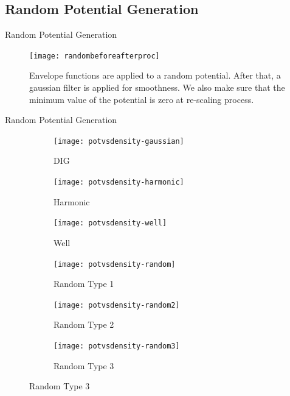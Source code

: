 \documentclass{beamer}
\begin{document}
\subsection{Random Potential Generation}

\begin{frame}{Random Potential Generation}

\graphicspath{{"../figs/potentials/"}}
\begin{figure}[H]
    \texttt{[image: randombeforeafterproc]}
\caption{Envelope functions are applied to a random potential. After that, a gaussian filter is applied for smoothness. We also make sure that the minimum value of the potential is zero at re-scaling process.}
\end{figure}

    
\end{frame}



\begin{frame}{Random Potential Generation}


\graphicspath{{"../figs/potentials/"}}
\begin{figure}[H]
    \centering
    \begin{subfigure}[t]{0.30\textwidth}
        \texttt{[image: potvsdensity-gaussian]}
        \caption{DIG}
    \end{subfigure}
    \begin{subfigure}[t]{0.30\textwidth}
        \texttt{[image: potvsdensity-harmonic]}
        \caption{Harmonic}
    \end{subfigure}
    \begin{subfigure}[t]{0.30\textwidth}
        \texttt{[image: potvsdensity-well]}
        \caption{Well}
    \end{subfigure}
    \begin{subfigure}[t]{0.30\textwidth}
        \texttt{[image: potvsdensity-random]}
        \caption{Random Type 1}
    \end{subfigure}
    \begin{subfigure}[t]{0.30\textwidth}
        \texttt{[image: potvsdensity-random2]}
        \caption{Random Type 2}
    \end{subfigure}
    \begin{subfigure}[t]{0.30\textwidth}
        \texttt{[image: potvsdensity-random3]}
        \caption{Random Type 3}
    \end{subfigure}
\end{figure}
 
\end{frame}
\end{document}
